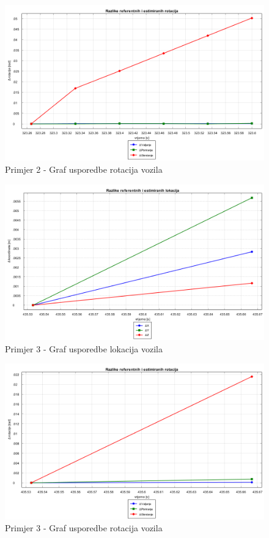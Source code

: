 \begin{figure}[H]
  \includegraphics[scale=0.4]{images/imgs/2_ravno_rotacije.png}
  \caption{Primjer 2 - Graf usporedbe rotacija vozila}
  \label{eval:primjer_2_rotacija}
\end{figure}
\begin{figure}[H]
  \includegraphics[scale=0.4]{images/imgs/3_ravno_lokacije.png}
  \caption{Primjer 3 - Graf usporedbe lokacija vozila}
  \label{eval:primjer_3_rotacija}
\end{figure}
\begin{figure}[H]
  \includegraphics[scale=0.4]{images/imgs/3_ravno_rotacije.png}
  \caption{Primjer 3 - Graf usporedbe rotacija vozila}
  \label{eval:primjer_3_rotacija}
\end{figure}
